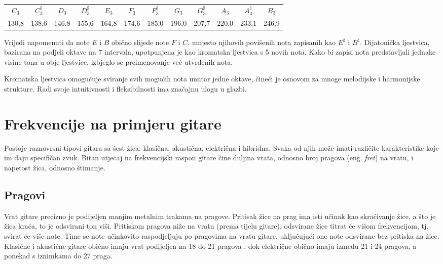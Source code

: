 \documentclass[times, utf8, diplomski, numeric]{fer}
\begin{document}
\begin{center}
	\footnotesize
	\begin{tabular}{c c c c c c c c c c c c}
		$C_3$ & $C_3^\sharp$ & $D_3$ & $D_3^\sharp$ & $E_3$ & $F_3$ & $F_3^\sharp$ & $G_3$ & $G_3^\sharp$ & $A_3$ & $A_3^\sharp$ & $B_3$\\
		130,8 & 138,6 & 146,8 & 155,6 & 164,8 & 174,6 & 185,0 & 196,0 & 207,7 & 220,0 & 233,1 & 246,9\\
	\end{tabular}
\end{center}

Vrijedi napomenuti da note $E$ i $B$ obično slijede note $F$ i $C$, umjesto njihovih povišenih nota zapisanih kao $E^\sharp$ i $B^\sharp$. Dijatonička ljestvica, bazirana na podjeli oktave na 7 intervala, upotpunjena je kao kromatska ljestvica s 5 novih nota. Kako bi zapisi nota predstavljali jednake visine tona u obje ljestvice, izbjeglo se preimenovanje već utvrđenih nota.\cite{enciklopedijaDijatonikaHrvatska}

Kromatska ljestvica omogućuje sviranje svih mogućih nota unutar jedne oktave, čineći je osnovom za mnoge melodijske i harmonijske strukture. Radi svoje intuitivnosti i fleksibilnosti ima značajnu ulogu u glazbi.
%

\chapter{Frekvencije na primjeru gitare}
Postoje raznovrsni tipovi gitara sa šest žica: klasična, akustična, električna i hibridna. Svaka od njih može imati različite karakteristike koje im daju specifičan zvuk. Bitan utjecaj na frekvencijski raspon gitare čine duljina vrata, odnosno broj pragova (eng. \textit{fret}) na vratu, i napetost žica, odnosno štimanje.

\section{Pragovi}
Vrat gitare precizno je podijeljen manjim metalnim trakama na pragove. Pritisak žice na prag ima isti učinak kao skraćivanje žice, a što je žica kraća, to je odsvirani ton viši. Pritiskom pragova niže na vratu (prema tijelu gitare), odsvirane žice titrat će višom frekvencijom, tj. svirat će više note. Time se note učinkovito raspodjeljuju po pragovima na vratu gitare, uključujući one note odsvirane bez pritiska na žice. Klasične i akustične gitare obično imaju vrat podijeljen na 18 do 21 pragova , dok električne obično imaju između 21 i 24 pragova, a ponekad s iznimkama do 27 praga.
\end{document}
